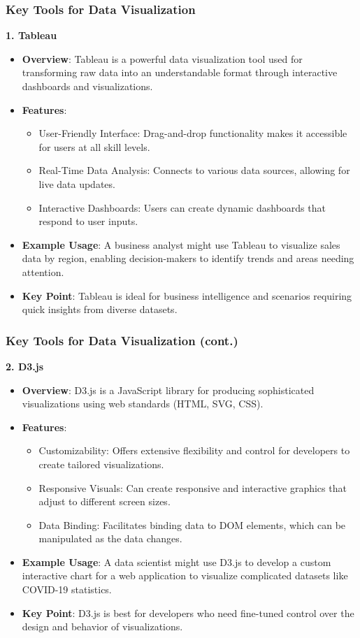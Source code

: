 \documentclass{beamer}
\begin{document}
\begin{frame}[fragile]
    \frametitle{Key Tools for Data Visualization}
    \textbf{1. Tableau}
    \begin{itemize}
        \item \textbf{Overview}: Tableau is a powerful data visualization tool used for transforming raw data into an understandable format through interactive dashboards and visualizations.
        \item \textbf{Features}:
        \begin{itemize}
            \item User-Friendly Interface: Drag-and-drop functionality makes it accessible for users at all skill levels.
            \item Real-Time Data Analysis: Connects to various data sources, allowing for live data updates.
            \item Interactive Dashboards: Users can create dynamic dashboards that respond to user inputs.
        \end{itemize}
        \item \textbf{Example Usage}: A business analyst might use Tableau to visualize sales data by region, enabling decision-makers to identify trends and areas needing attention.
        \item \textbf{Key Point}: Tableau is ideal for business intelligence and scenarios requiring quick insights from diverse datasets.
    \end{itemize}
\end{frame}

\begin{frame}[fragile]
    \frametitle{Key Tools for Data Visualization (cont.)}
    \textbf{2. D3.js}
    \begin{itemize}
        \item \textbf{Overview}: D3.js is a JavaScript library for producing sophisticated visualizations using web standards (HTML, SVG, CSS).
        \item \textbf{Features}:
        \begin{itemize}
            \item Customizability: Offers extensive flexibility and control for developers to create tailored visualizations.
            \item Responsive Visuals: Can create responsive and interactive graphics that adjust to different screen sizes.
            \item Data Binding: Facilitates binding data to DOM elements, which can be manipulated as the data changes.
        \end{itemize}
        \item \textbf{Example Usage}: A data scientist might use D3.js to develop a custom interactive chart for a web application to visualize complicated datasets like COVID-19 statistics.
        \item \textbf{Key Point}: D3.js is best for developers who need fine-tuned control over the design and behavior of visualizations.
    \end{itemize}
\end{frame}
\end{document}
